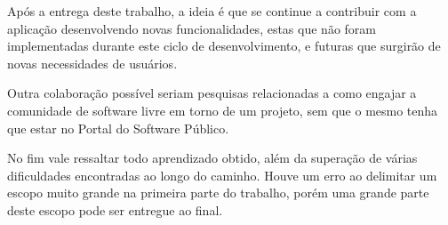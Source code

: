 Após a entrega deste trabalho, a ideia é que se continue a contribuir com a aplicação desenvolvendo novas funcionalidades, estas que não foram implementadas durante este ciclo de desenvolvimento, e futuras que surgirão de novas necessidades de usuários.

Outra colaboração possível seriam pesquisas relacionadas a como engajar a comunidade de software livre em torno de um projeto, sem que o mesmo tenha que estar no Portal do Software Público.

No fim vale ressaltar todo aprendizado obtido, além da superação de várias dificuldades encontradas ao longo do caminho. Houve um erro ao delimitar um escopo muito grande na primeira parte do trabalho, porém uma grande parte deste escopo pode ser entregue ao final.
